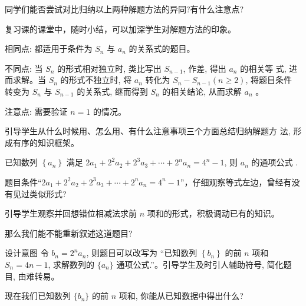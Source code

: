 \begin{question}
  同学们能否尝试对比归纳以上两种解题方法的异同?有什么注意点?
\end{question}

\begin{designgoal}
  复习课的课堂中，随时小结，可以加深学生对解题方法的印象。
\end{designgoal}

相同点: 都适用于条件为 $S_{n}$ 与 $a_{n}$ 的关系式的题目。

不同点: 当 $S_{n}$ 的形式相对独立时, 类比写出 $S_{n-1}$, 作差, 得出 $a_{n}$ 的相关等 式, 进而求解。当 $S_{n}$ 的形式不独立时, 将 $a_{n}$ 转化为 $S_{n}-S_{n-1}(n \geq 2)$, 将题目条件 转变为 $S_n$ 与 $S_{n-1}$ 的关系式, 继而得到 $S_n$ 的相关结论, 从而求解 $a_n$ 。

注意点: 需要验证 $n=1$ 的情况。

引导学生从什么时候用、怎么用、有什么注意事项三个方面总结归纳解题方 法, 形成有序的知识框架。


\begin{example}[2020·尤溪县第五中学高一期末]\label{example:尤溪县第五中学高一期末}
  已知数列 $\left\{a_{n}\right\}$ 满足 $2 a_{1}+2^{2} a_{2}+2^{3} a_{3}+\cdots+2^{n} a_{n}=4^{n}-1$, 则 $a_{n}$ 的通项公式 \underline{\hspace*{3em}}.
\end{example}

\begin{question}
  题目条件“$2 a_{1}+2^{2} a_{2}+2^{3} a_{3}+\cdots+2^{n} a_{n}=4^{n}-1$”，仔细观察等式左边，曾经有没有见过类似形式?
\end{question}

\begin{designgoal}
  引导学生观察并回想错位相减法求前 $n$ 项和的形式，积极调动已有的知识。
\end{designgoal}

\begin{question}
  那么我们能不能重新叙述这道题目?
\end{question}

\begin{designgoal}
  设计意图 令 $b_n=2^{n} a_n$, 则题目可以改写为 “已知数列 $\left\{b_{n}\right\}$ 的前 $n$ 项和 $S_{n}=4 n-1$, 求解数列的 $\{a_{n}\}$ 通项公式.”。引导学生及时引人辅助符号, 简化题目, 由难转易。
\end{designgoal}

\begin{question}
  现在我们已知数列 $\{b_{n}\}$ 的前 $n$ 项和, 你能从已知数据中得出什么?
\end{question}

